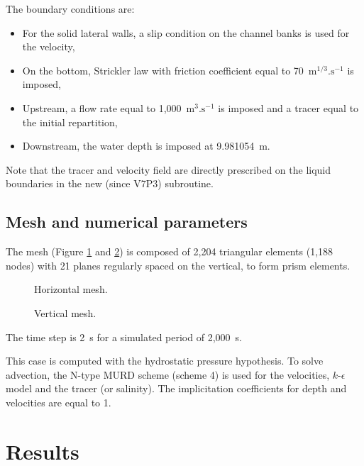 \bigskip
The boundary conditions are:
\begin{itemize}
\item For the solid lateral walls, a slip condition 
on the channel banks is used for the velocity,
\item On the bottom, Strickler law with friction coefficient equal to 
70~$\text{m}^{1/3}.\text{s}^{-1}$ is imposed,
\item Upstream, a flow rate equal to 1,000~$\text{m}^{3}.\text{s}^{-1}$ is imposed
and a tracer equal to the initial repartition,
\item Downstream, the water depth is imposed at 9.981054~m.
\end{itemize}
Note that the tracer and velocity field are directly prescribed on the liquid
boundaries in the new (since V7P3)  subroutine.

\subsection{Mesh and numerical parameters}
\bigskip
The mesh (Figure \ref{t3d:stratification:fig:meshH} and \ref{t3d:stratification:fig:meshV})  
is composed of 2,204 triangular elements (1,188 nodes) with 21 planes  
regularly spaced on the vertical, to form prism elements.\\

\begin{figure}[!htbp]
 \centering
 \caption{Horizontal mesh.}
 \label{t3d:stratification:fig:meshH}
\end{figure}
\begin{figure}[!htbp]
 \centering
 \caption{Vertical mesh.}
 \label{t3d:stratification:fig:meshV}
\end{figure}

\bigskip
The time step is 2~s for a simulated period of 2,000~s. 

\bigskip
This case is computed with the hydrostatic pressure hypothesis.  To solve advection, the N-type MURD scheme (scheme 4) 
is used for the velocities, $k$-$\epsilon$ model and the tracer (or salinity). 
The implicitation coefficients for depth and velocities are equal to 1.\\

\section{Results}

